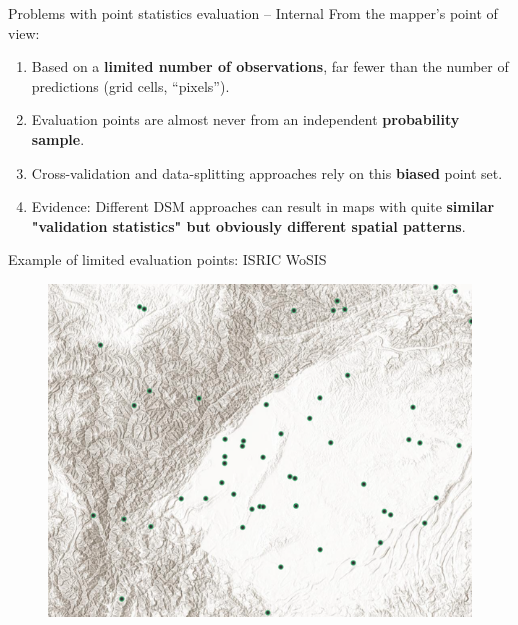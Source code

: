 \documentclass[aspectratio=169]{beamer}
\begin{document}
\begin{frame}{Problems with point statistics evaluation -- Internal}
From the mapper's point of view:
\begin{enumerate}
    \item Based on a \textbf{limited number of observations}, far fewer than the number of predictions (grid cells, ``pixels'').
\item Evaluation points are almost never from an independent \textbf{probability sample}.
\item Cross-validation and data-splitting approaches rely on this \textbf{biased} point set.
\item Evidence: Different DSM approaches can result in maps with quite \textbf{similar "validation statistics" but obviously different spatial patterns}.
  \end{enumerate}
  
\end{frame}


\begin{frame}{Example of limited evaluation points: ISRIC WoSIS}
\begin{figure}
    \centering
\includegraphics[height=0.7\textheight]{./graphics_david/SoilGridsProfiles_Chengdu.png}
\end{figure}
\end{frame}
\end{document}
